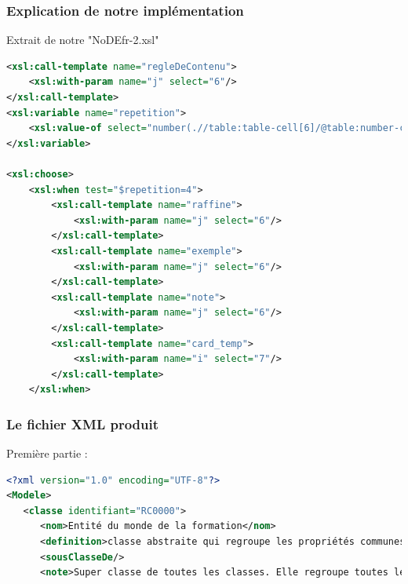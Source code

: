 \documentclass{beamer}
\begin{document}
\begin{frame}[fragile]
\frametitle{Explication de notre implémentation}

Extrait de notre "NoDEfr-2.xsl"

\vspace{0.5cm}
\begin{lstlisting}[language=XML]
<xsl:call-template name="regleDeContenu">
    <xsl:with-param name="j" select="6"/>
</xsl:call-template>
<xsl:variable name="repetition">
    <xsl:value-of select="number(.//table:table-cell[6]/@table:number-columns-repeated)"/>
</xsl:variable>

<xsl:choose>
    <xsl:when test="$repetition=4">
        <xsl:call-template name="raffine">
            <xsl:with-param name="j" select="6"/>
        </xsl:call-template>
        <xsl:call-template name="exemple">
            <xsl:with-param name="j" select="6"/>
        </xsl:call-template>
        <xsl:call-template name="note">
            <xsl:with-param name="j" select="6"/>
        </xsl:call-template>
        <xsl:call-template name="card_temp">
            <xsl:with-param name="i" select="7"/>
        </xsl:call-template>
    </xsl:when>
\end{lstlisting}
\end{frame}

\begin{frame}[fragile]
\frametitle{Le fichier XML produit}

Première partie :

\vspace{0.5cm}
\begin{lstlisting}[language=XML]
<?xml version="1.0" encoding="UTF-8"?>
<Modele>
   <classe identifiant="RC0000">
      <nom>Entité du monde de la formation</nom>
      <definition>classe abstraite qui regroupe les propriétés communes à toutes les situations ou à l ensemble de situations visant un ou plusieurs objectifs de développement personnel ou professionnel</definition>
      <sousClasseDe/>
      <note>Super classe de toutes les classes. Elle regroupe toutes les propriétés des classes présentes dans ce modèle  </note>
\end{lstlisting}
\end{frame}
\end{document}
